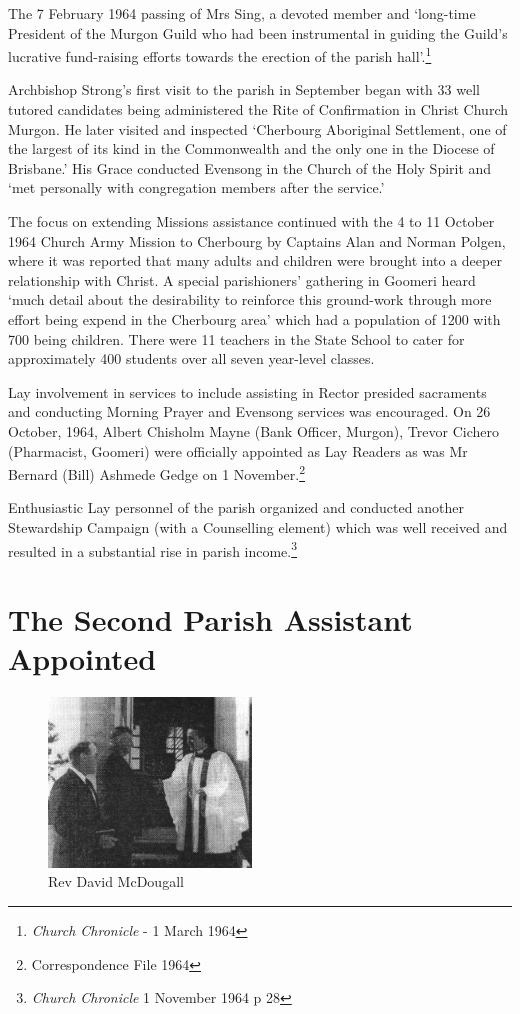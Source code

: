 The 7 February 1964 passing of Mrs Sing, a devoted member and `long-time
President of the Murgon Guild who had been instrumental in guiding the
Guild's lucrative fund-raising efforts towards the erection of the
parish hall'.\footnote{\emph{Church Chronicle} - 1 March 1964}

Archbishop Strong's first visit to the parish in September began with 33
well tutored candidates being administered the Rite of Confirmation in
Christ Church Murgon. He later visited and inspected `Cherbourg
Aboriginal Settlement, one of the largest of its kind in the
Commonwealth and the only one in the Diocese of Brisbane.' His Grace
conducted Evensong in the Church of the Holy Spirit and `met personally
with congregation members after the service.'

The focus on extending Missions assistance continued with the 4 to 11
October 1964 Church Army Mission to Cherbourg by Captains Alan and
Norman Polgen, where it was reported that many adults and children were
brought into a deeper relationship with Christ. A special parishioners'
gathering in Goomeri heard `much detail about the desirability to
reinforce this ground-work through more effort being expend in the
Cherbourg area' which had a population of 1200 with 700 being children.
There were 11 teachers in the State School to cater for approximately
400 students over all seven year-level classes.

Lay involvement in services to include assisting in Rector presided
sacraments and conducting Morning Prayer and Evensong services was
encouraged. On 26 October, 1964, Albert Chisholm Mayne (Bank Officer,
Murgon), Trevor Cichero (Pharmacist, Goomeri) were officially appointed
as Lay Readers as was Mr Bernard (Bill) Ashmede Gedge on 1
November.\footnote{Correspondence File 1964}

Enthusiastic Lay personnel of the parish organized and conducted another
Stewardship Campaign (with a Counselling element) which was well
received and resulted in a substantial rise in parish income.\footnote{\emph{Church
  Chronicle} 1 November 1964 p 28}

\section{The Second Parish Assistant
Appointed}




\begin{figure}
\begin{center}
\includegraphics[width=0.48\textwidth,right]{images/DMcDougall.jpg}
\caption{Rev David McDougall}
\end{center}
\end{figure}


